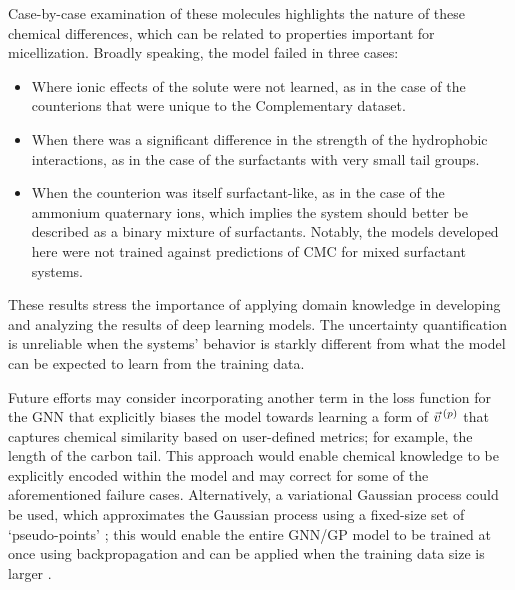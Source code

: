 Case-by-case examination of these molecules highlights the nature of these
chemical differences, which can be related to properties important for
micellization. Broadly speaking, the model failed in three cases:
\begin{itemize}
    \item Where ionic effects of the solute were not learned, as in the case of the counterions that were unique to the Complementary dataset.
    \item When there was a significant difference in the strength of the
          hydrophobic interactions, as in the case of the surfactants with very small
          tail groups.
    \item When the counterion was itself surfactant-like, as in the case of the
          ammonium quaternary ions, which implies the system should better be
          described as a binary mixture of surfactants. Notably, the models
          developed here were not trained against predictions of CMC for mixed
          surfactant systems.
\end{itemize}
These results stress the importance of applying domain knowledge in developing
and analyzing the results of deep learning models. The uncertainty
quantification is unreliable when the systems' behavior is starkly different
from what the model can be expected to learn from the training data.

Future efforts may consider incorporating another term in the loss function for
the GNN that explicitly biases the model towards learning a form of $\vec{v}^{\,(p)}{}$
that captures chemical similarity based on user-defined metrics; for example,
the length of the carbon tail. This approach would enable chemical knowledge to
be explicitly encoded within the model and may correct for some of the
aforementioned failure cases. Alternatively, a variational Gaussian process
could be used, which approximates the Gaussian process using a fixed-size set of
`pseudo-points' \cite{hensmanGaussianProcessesBig2013}; this would enable the
entire GNN/GP model to be trained at once using backpropagation and can be
applied when the training data size is larger
\cite{moriartyUnlockNNUncertaintyQuantification2022}.